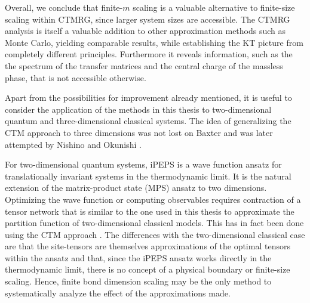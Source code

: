 Overall, we conclude that finite-$m$ scaling is a valuable alternative to finite-size scaling within CTMRG,
since larger system sizes are accessible.
The CTMRG analysis is itself a valuable addition to other approximation methods such as Monte Carlo,
yielding comparable results, while establishing the KT picture from completely different principles.
Furthermore it reveals information, such as the the spectrum of the transfer matrices and the central charge of the
massless phase, that is not accessible otherwise.

Apart from the possibilities for improvement already mentioned, it is
useful to consider the application of the methods in this thesis to
two-dimensional quantum and three-dimensional classical systems. The idea
of generalizing the CTM approach to three dimensions was not lost on
Baxter \cite[p. 401]{baxter1982exactly} and was later attempted by Nishino
and Okunishi \cite{nishino1998density}.

For two-dimensional quantum systems, iPEPS \cite{jordan2008classical} is
a wave function ansatz for translationally invariant systems in the
thermodynamic limit. It is the natural extension of the matrix-product
state (MPS) ansatz to two dimensions.
Optimizing the wave function or computing observables requires contraction
of a tensor network that is similar to the one used in this thesis to
approximate the partition function of two-dimensional classical models.
This has in fact been done using the CTM approach
\cite{orus2009simulation}.
The differences with the two-dimensional classical case are that the
site-tensors are themselves approximations of the optimal tensors within
the ansatz and that, since the iPEPS ansatz works directly in the
thermodynamic limit, there is no concept of a physical boundary or
finite-size scaling. Hence, finite bond dimension scaling may be the only
method to systematically analyze the effect of the approximations made.
